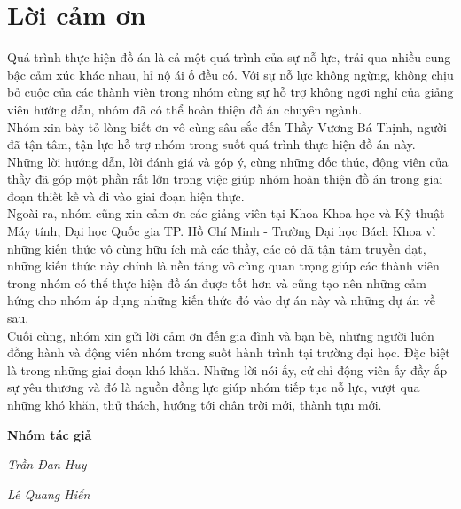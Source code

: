 \section*{Lời cảm ơn}
\thispagestyle{empty}
\hspace*{0.5cm} Quá trình thực hiện đồ án là cả một quá trình của sự nỗ lực, trải qua nhiều cung bậc cảm xúc khác nhau, hỉ nộ ái ố đều có. Với sự nỗ lực không ngừng, không chịu bỏ cuộc của các thành viên trong nhóm cùng sự hỗ trợ không ngơi nghỉ của giảng viên hướng dẫn, nhóm đã có thể hoàn thiện đồ án chuyên ngành.\\
\hspace*{0.5cm} Nhóm xin bày tỏ lòng biết ơn vô cùng sâu sắc đến Thầy Vương Bá Thịnh, người đã tận tâm, tận lực hỗ trợ nhóm trong suốt quá trình thực hiện đồ án này. Những lời hướng dẫn, lời đánh giá và góp ý, cùng những đốc thúc, động viên của thầy đã góp một phần rất lớn trong việc giúp nhóm hoàn thiện đồ án trong giai đoạn thiết kế và đi vào giai đoạn hiện thực.\\
\hspace*{0.5cm} Ngoài ra, nhóm cũng xin cảm ơn các giảng viên tại Khoa Khoa học và Kỹ thuật Máy tính, Đại học Quốc gia TP. Hồ Chí Minh - Trường Đại học Bách Khoa vì những kiến thức vô cùng hữu ích mà các thầy, các cô đã tận tâm truyền đạt, những kiến thức này chính là nền tảng vô cùng quan trọng giúp các thành viên trong nhóm có thể thực hiện đồ án được tốt hơn và cũng tạo nên những cảm hứng cho nhóm áp dụng những kiến thức
đó vào dự án này và những dự án về sau.\\
\hspace*{1cm} Cuối cùng, nhóm xin gửi lời cảm ơn đến gia đình và bạn bè, những người luôn đồng hành và động viên nhóm trong suốt hành trình tại trường đại học. Đặc biệt là trong những giai đoạn khó khăn. Những lời nói ấy, cử chỉ động viên ấy đầy ắp sự yêu thương và đó là nguồn đồng lực giúp nhóm tiếp tục nỗ lực, vượt qua những khó khăn, thử thách, hướng tới chân trời mới, thành tựu mới.
 
\par\hfill\textbf{Nhóm tác giả}\hspace{1cm}
\par\hfill\textit{Trần Đan Huy}\hspace{1cm}
\par\hfill\textit{Lê Quang Hiển}\hspace{1cm}

\clearpage
{}
